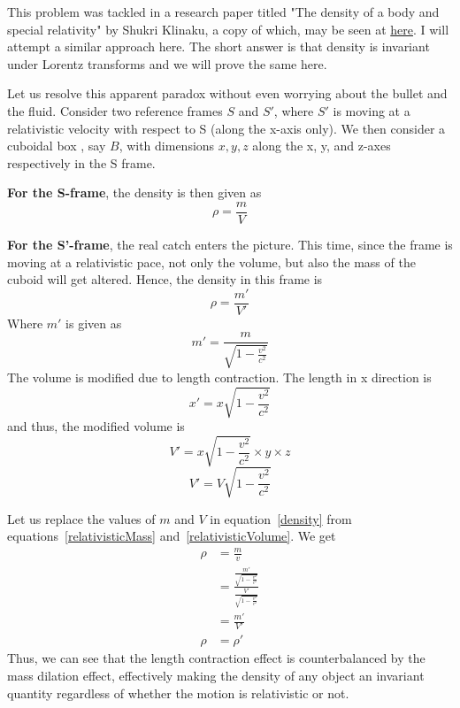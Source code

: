This problem was tackled in a research paper titled "The density of a body and special relativity" by Shukri Klinaku, a copy of which, may be seen at \href{https://www.researchgate.net/publication/283213614_The_Density_of_a_Body_and_Special_Relativity}{here}. I will attempt a similar approach here. The short answer is that density is invariant under Lorentz transforms and we will prove the same here.

Let us resolve this apparent paradox without even worrying about the bullet and the fluid. Consider two reference frames $S$ and $S'$, where $S'$ is moving at a relativistic velocity with respect to  S (along the x-axis only). We then consider a cuboidal box , say $B$, with dimensions $x,y,z$ along the x, y, and z-axes respectively in the S frame.

\textbf{For the S-frame}, the density is then given as 
\begin{equation}
    \rho = \frac{m}{V}
    \label{density}
\end{equation}


\textbf{For the S'-frame}, the real catch enters the picture. This time, since the frame is moving at a relativistic pace, not only the volume, but also the mass of the cuboid will get altered. Hence, the density in this frame is $$\rho = \frac{m'}{V'}$$
Where $m'$ is given as 
\begin{equation}
    m' = \frac{m}{\sqrt{1-\frac{v^2}{c^2}}}
    \label{relativisticMass}
\end{equation}
The volume is modified due to length contraction. The length in x direction is $$x' = x \sqrt{1-\frac{v^2}{c^2}}$$
and thus, the modified volume is $$V' = x \sqrt{1-\frac{v^2}{c^2}} \times y \times z$$
\begin{equation}
    V' = V \sqrt{1-\frac{v^2}{c^2}}
    \label{relativisticVolume}
\end{equation}


Let us replace the values of $m$ and $V$ in equation~\ref{density} from equations~\ref{relativisticMass} and~\ref{relativisticVolume}. We get
\begin{align*}
    \rho &= \frac{m}{v}\\
        &= \frac{\frac{m'}{\sqrt{1-\frac{v^2}{c^2}}}}{\frac{V'}{\sqrt{1-\frac{v^2}{c^2}}}}\\
        &= \frac{m'}{V'}\\
    \rho &= \rho '
\end{align*}
Thus, we can see that the length contraction effect is counterbalanced by the mass dilation effect, effectively making the density of any object an invariant quantity regardless of whether the motion is relativistic or not.
